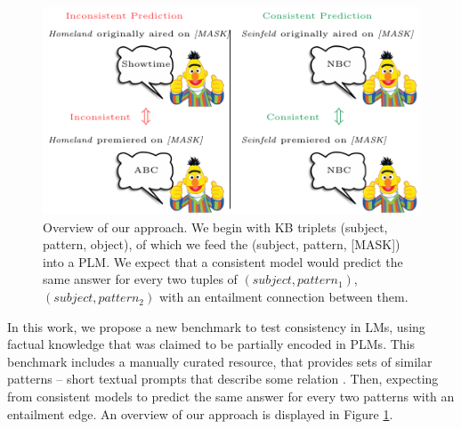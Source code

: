 \begin{figure}[t!]
\centering

\includegraphics[width=1.\columnwidth]{figures/overview}

\caption{Overview of our approach. We begin with KB triplets (subject, pattern, object), of which we feed the (subject, pattern, [MASK]) into a PLM. 
We expect that a consistent model would predict the same answer for every two tuples of $(subject, pattern_1)$, $(subject, pattern_2)$ with an entailment connection between them. }
\label{fig:overview}
\end{figure}




In this work, we propose a new benchmark to test consistency in LMs, using factual knowledge that was claimed to be partially encoded in PLMs.
This benchmark includes a manually curated resource, that provides sets of similar patterns -- short textual prompts that describe some relation .
Then, expecting from consistent models to predict the same answer for every two patterns with an entailment edge. 
An overview of our approach is displayed in Figure \ref{fig:overview}.




